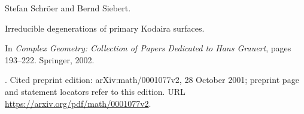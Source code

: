 Stefan Schr{\"o}er and Bernd Siebert.

\newblock Irreducible degenerations of primary {Kodaira} surfaces.

\newblock In \emph{Complex Geometry: Collection of Papers Dedicated to Hans
  Grauert}, pages 193--222. Springer, 2002.

\newblock {}.
\newblock Cited preprint edition: arXiv:math/0001077v2, 28 October 2001;
preprint page and statement locators refer to this edition.
\newblock URL \url{https://arxiv.org/pdf/math/0001077v2}.

